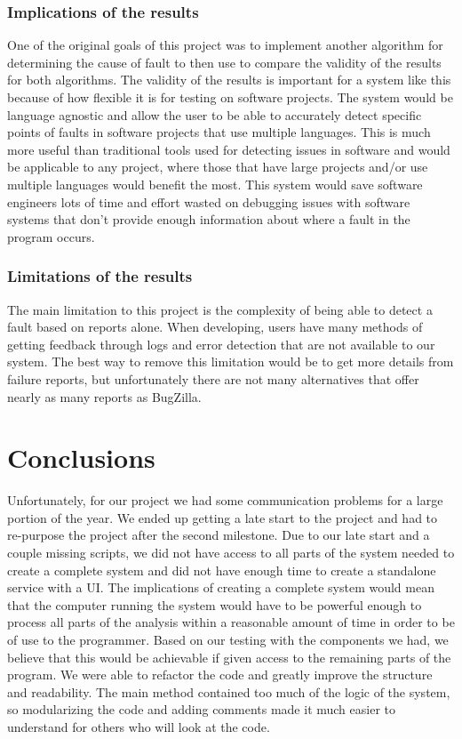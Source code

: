 \documentclass[12pt]{article}
\begin{document}
\subsubsection{Implications of the
results}\label{implications-of-the-results}

One of the original goals of this project was to implement another
algorithm for determining the cause of fault to then use to compare the
validity of the results for both algorithms. The validity of the results
is important for a system like this because of how flexible it is for
testing on software projects. The system would be language agnostic and
allow the user to be able to accurately detect specific points of faults
in software projects that use multiple languages. This is much more
useful than traditional tools used for detecting issues in software and
would be applicable to any project, where those that have large projects
and/or use multiple languages would benefit the most. This system would
save software engineers lots of time and effort wasted on debugging
issues with software systems that don't provide enough information about
where a fault in the program occurs.

\subsubsection{Limitations of the
results}\label{limitations-of-the-results}

The main limitation to this project is the complexity of being able to
detect a fault based on reports alone. When developing, users have many
methods of getting feedback through logs and error detection that are
not available to our system. The best way to remove this limitation
would be to get more details from failure reports, but unfortunately
there are not many alternatives that offer nearly as many reports as
BugZilla.

\section{Conclusions}\label{conclusions}

Unfortunately, for our project we had some communication problems for a
large portion of the year. We ended up getting a late start to the
project and had to re-purpose the project after the second milestone.
Due to our late start and a couple missing scripts, we did not have
access to all parts of the system needed to create a complete system and
did not have enough time to create a standalone service with a UI. The
implications of creating a complete system would mean that the computer
running the system would have to be powerful enough to process all parts
of the analysis within a reasonable amount of time in order to be of use
to the programmer. Based on our testing with the components we had, we
believe that this would be achievable if given access to the remaining
parts of the program. We were able to refactor the code and greatly
improve the structure and readability. The main method contained too
much of the logic of the system, so modularizing the code and adding
comments made it much easier to understand for others who will look at
the code.
\end{document}
